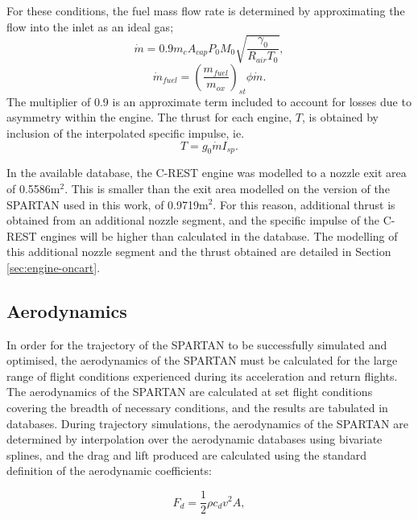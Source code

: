 For these conditions, the fuel mass flow rate is determined by approximating the flow into the inlet as an ideal gas; 
\begin{equation}
\dot{m} = 0.9 m_c A_{cap} P_0 M_0 \sqrt{\dfrac{\gamma_0}{R_{air} T_0}},
\end{equation}
\begin{equation}
\dot{m}_{fuel} = (\dfrac{m_{fuel}}{m_{ox}} )_{st} \phi \dot{m}.
\end{equation}
The multiplier of 0.9 is an approximate term included to account for losses due to asymmetry within the engine\cite{Preller2018a}. 
The thrust for each engine, $T$, is obtained by inclusion of the interpolated specific impulse, ie. 
\begin{equation}
T = g_0\dot{m}I_{sp}. 
\end{equation}

In the available database, the C-REST engine was modelled to a nozzle exit area of 0.5586m$^2$. This is smaller than the exit area modelled on the version of the SPARTAN used in this work, of 0.9719m$^2$. For this reason, additional thrust is obtained from an additional nozzle segment, and the specific impulse of the C-REST engines will be higher than calculated in the database. The modelling of this additional nozzle segment and the thrust obtained are detailed in Section \ref{sec:engine-oncart}.






		
		
		\subsection{Aerodynamics}\label{sec:aero}
		
		
		
In order for the trajectory of the SPARTAN to be successfully simulated and optimised, the aerodynamics of the SPARTAN must be calculated for the large range of flight conditions experienced during its acceleration and return flights. 
The aerodynamics of the SPARTAN are calculated at set flight conditions covering the breadth of necessary conditions, and the results are tabulated in databases. During trajectory simulations, the aerodynamics of the SPARTAN are determined by interpolation over the aerodynamic databases using bivariate splines, and the drag and lift produced are calculated using the standard definition of the aerodynamic coefficients:

\begin{equation}
F_d = \frac{1}{2}\rho c_d v^2 A ,
\end{equation}

